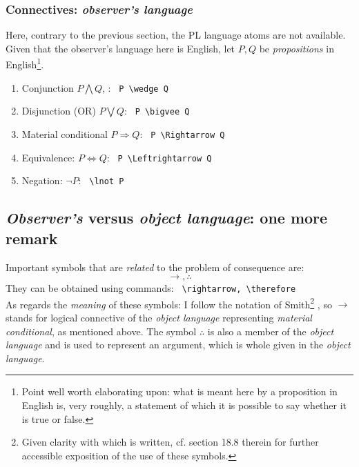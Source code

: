 \documentclass[12pt]{article}
\begin{document}
\subsubsection{Connectives: \textit{observer's language}}
Here, contrary to the previous section, the PL language atoms are not available. Given that the observer's language here is English, let $P, Q$ be \textit{propositions} in
English\footnote{Point well worth elaborating upon: what is meant here by a proposition in English is, very roughly, a statement of which it is possible to say whether it is true or false. }.
\begin{enumerate}
\item Conjunction $ P \bigwedge Q $, : \verb+ P \wedge Q +
\item Disjunction (OR) $P \bigvee Q$: \verb+ P \bigvee Q + 
\item Material conditional $ P \Rightarrow Q $: \verb+ P \Rightarrow Q +
\item Equivalence: $ P \Leftrightarrow Q$: \verb+ P \Leftrightarrow Q +
\item Negation: $ \lnot P $: \verb+ \lnot P +
\end{enumerate}

\subsection{\textit{Observer's} versus \textit{object language}: one more remark}
Important symbols that are \textit{related} to the problem of consequence are:
$$ \rightarrow,  \therefore $$
They can be obtained using commands: \verb+ \rightarrow, \therefore +
\\ As regards the \textit{meaning} of these symbols: I follow the notation of Smith\footnote{Given clarity with which \cite{smith_intro_formal_logic} is written, cf. section 18.8 therein for further accessible exposition of the use of these symbols.} \cite{smith_intro_formal_logic}, so $\rightarrow$ stands for logical connective of the \textit{object language} representing \textit{material conditional}, as mentioned above. The symbol $\therefore$ is also a member of the \textit{object language} and is used to represent an argument, which is whole given in the \textit{object language}.
\end{document}
